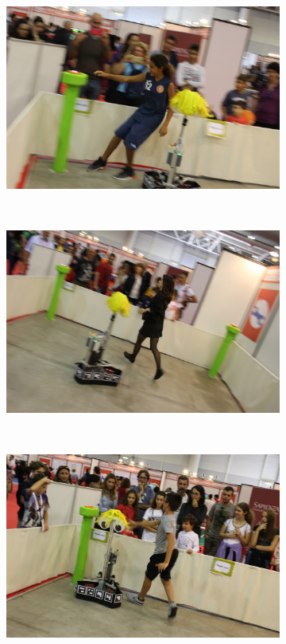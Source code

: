 \begin{figure}[h]
\begin{subfigure}[h]{0.49\columnwidth}
        \caption{}
    \end{subfigure}
    ~
    \begin{subfigure}[h]{0.49\columnwidth}
        \centering
        \includegraphics[width=\linewidth]{images/06-deception/mfIV}
        \caption{}
    \end{subfigure}
    ~
    \begin{subfigure}[h]{0.49\columnwidth}
        \centering
        \includegraphics[width=\linewidth]{images/06-deception/mfV}
        \caption{}
    \end{subfigure}
    ~
    \begin{subfigure}[h]{0.49\columnwidth}
        \centering
        \includegraphics[width=\linewidth]{images/06-deception/mfVI}

\end{subfigure}
\end{figure}
